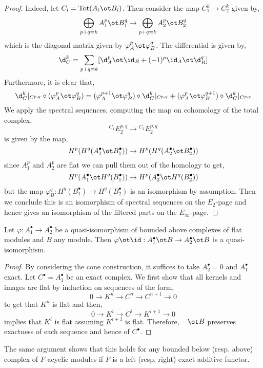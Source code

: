 \documentclass[12pt]{article}
\begin{document}
\begin{proof}
Indeed, let $C_i = \Tot(A_i \ot B_i)$. Then consider the map $C_1^k \to C_2^k$ given by,
\[ \bigoplus_{p + q = k} A^p_1 \ot B^q_1 \to \bigoplus_{p + q = k} A^p_2 \ot B^q_2 \]
which is the diagonal matrix given by $\varphi_A^p \ot \varphi_B^q$. The differential is given by,
\[ \d^k_C = \sum_{p + q = k} [\d^p_A \ot \id_B + (-1)^p \id_A \ot \d^q_B] \]
Furthermore, it is clear that,
\[ \d_C^k|_{C^{p,q}} \circ (\varphi_A^p \ot \varphi_B^q) = (\varphi_A^{p+1} \ot \varphi_B^q) \circ \d_C^k|_{C^{p,q}} + (\varphi_A^{p} \ot \varphi_B^{q+1}) \circ \d_C^k|_{C^{p,q}} \]
We apply the spectral sequences, computing the map on cohomology of the total complex,
\[ {}^{C_1} E^{p,q}_2 \to {}^{C_2} E^{p,q}_2 \]
is given by the map,
\[ H^p(H^q(A_1^\bullet \ot B_1^\bullet)) \to H^p(H^q(A_2^\bullet \ot B_2^\bullet)) \]
since $A_1^p$ and $A_2^p$ are flat we can pull them out of the homology to get,
\[ H^p(A_1^\bullet \ot H^q(B_1^\bullet)) \to H^p(A_2^\bullet \ot H^q(B_2^\bullet)) \]
but the map $\varphi_B^q : H^q(B_1^\bullet) \to H^q(B_2^\bullet)$ is an isomorphism by assumption. Then we conclude this is an isomorphism of spectral sequences on the $E_2$-page and hence gives an isomorphism of the filtered parts on the $E_{\infty}$-page.
\end{proof}

\begin{lemma}
Let $\varphi : A_1^\bullet \to A_2^\bullet$ be a quasi-isomorphism of bounded above complexes of flat modules and $B$ any module. Then $\varphi \ot \id : A_1^\bullet \ot B \to A_2^\bullet \ot B$ is a quasi-isomorphism.
\end{lemma}

\begin{proof}
By considering the cone construction, it suffices to take $A_2^\bullet = 0$ and $A_1^\bullet$ exact. Let $C^\bullet = A_1^\bullet$ be an exact complex. We first show that all kernels and images are flat by induction on sequences of the form,
\[ 0 \to K^n \to C^n \to C^{n+1} \to 0 \]
to get that $K^n$ is flat and then,
\[ 0 \to K^i \to C^i \to K^{i+1} \to 0 \]
implies that $K^i$ is flat assuming $K^{i+1}$ is flat. Therefore, $-\ot B$ preserves exactness of each sequence and hence of $C^\bullet$.
\end{proof}

\begin{rmk}
The same argument shows that this holds for any bounded below (resp. above) complex of $F$-acyclic modules if $F$ is a left (resp. right) exact additive functor.
\end{rmk}
\end{document}
